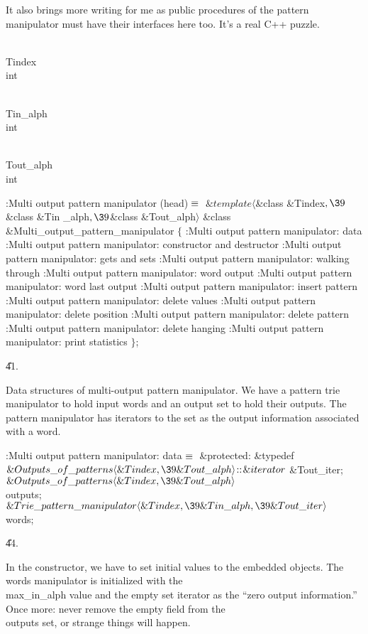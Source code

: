 It also brings more writing for me as public procedures of the pattern
manipulator must have their interfaces here too. It's a real C++ puzzle.

\Y\B\F\\{Tindex} \5
\\{int}\par
\B\F\\{Tin\_alph} \5
\\{int}\par
\B\F\\{Tout\_alph} \5
\\{int}\par
\Y\B\4:Multi output pattern manipulator (head)\X${}\equiv{}$\6
$\&{template}\langle{}$\&{class} \&{Tindex}${},\39{}$\&{class} \&{Tin%
\_alph}${},\39{}$\&{class} \&{Tout\_alph}${}\rangle{}$\6
\&{class} \&{Multi\_output\_pattern\_manipulator} ${}\{{}$\1\6
:Multi output pattern manipulator: data\X\6
:Multi output pattern manipulator: constructor and destructor\X\6
:Multi output pattern manipulator: gets and sets\X\7
:Multi output pattern manipulator: walking through\X\6
:Multi output pattern manipulator: word output\X\6
:Multi output pattern manipulator: word last output\X\6
:Multi output pattern manipulator: insert pattern\X\6
:Multi output pattern manipulator: delete values\X\6
:Multi output pattern manipulator: delete position\X\6
:Multi output pattern manipulator: delete pattern\X\6
:Multi output pattern manipulator: delete hanging\X\6
:Multi output pattern manipulator: print statistics\X\2\6
${}\}{}$;\par
\U41.\fi

Data structures of multi-output pattern manipulator. We have a pattern
trie manipulator to hold input words and an output set to hold their
outputs. The pattern manipulator has iterators to the set as the output
information associated with a word.

\Y\B\4:Multi output pattern manipulator: data\X${}\equiv{}$\6
\4\&{protected}:\6
\&{typedef} ${}\&{Outputs\_of\_patterns}\langle\&{Tindex},\39\&{Tout\_alph}%
\rangle\DC\&{iterator}{}$ \&{Tout\_iter};\6
${}\&{Outputs\_of\_patterns}\langle\&{Tindex},\39\&{Tout\_alph}\rangle{}$ %
\\{outputs};\6
${}\&{Trie\_pattern\_manipulator}\langle\&{Tindex},\39\&{Tin\_alph},\39\&{Tout%
\_iter}\rangle{}$ \\{words};\par
\U44.\fi

In the constructor, we have to set initial values to the embedded
objects. The \\{words} manipulator is initialized with the \\{max\_in\_alph}
value and the empty set iterator as the ``zero output information.''
Once more: never remove the empty field from the \\{outputs} set, or
strange things will happen.

